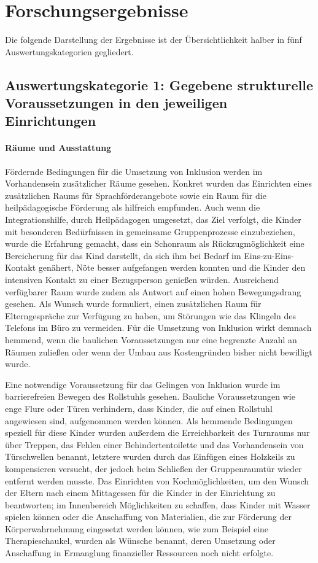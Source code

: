 \section{Forschungsergebnisse}
Die folgende Darstellung der Ergebnisse ist der Übersichtlichkeit halber in fünf Auswertungskategorien gegliedert.
 
\subsection{Auswertungskategorie 1: Gegebene strukturelle Voraussetzungen in den jeweiligen Einrichtungen}

\paragraph{Räume und Ausstattung}
Fördernde Bedingungen für die Umsetzung von Inklusion werden im Vorhandensein zusätzlicher Räume gesehen. Konkret wurden das Einrichten eines zusätzlichen Raums für Sprachförderangebote sowie ein Raum für die heilpädagogische Förderung als hilfreich empfunden. Auch wenn die Integrationshilfe, durch Heilpädagogen umgesetzt, das Ziel verfolgt, die Kinder mit besonderen Bedürfnissen in gemeinsame Gruppenprozesse einzubeziehen, wurde die Erfahrung gemacht, dass ein Schonraum als Rückzugmöglichkeit eine Bereicherung für das Kind darstellt, da sich ihm bei Bedarf im Eins-zu-Eins-Kontakt genähert, Nöte besser aufgefangen werden konnten und die Kinder den intensiven Kontakt zu einer Bezugsperson genießen würden. Ausreichend verfügbarer Raum wurde zudem als Antwort auf einen hohen Bewegungsdrang gesehen. Als Wunsch wurde formuliert, einen zusätzlichen Raum für Elterngespräche zur Verfügung zu haben, um Störungen wie das Klingeln des Telefons im Büro zu vermeiden. 
Für die Umsetzung von Inklusion wirkt demnach hemmend, wenn die baulichen Voraussetzungen nur eine begrenzte Anzahl an Räumen zuließen oder wenn der Umbau aus Kostengründen bisher nicht bewilligt wurde. 

Eine notwendige Voraussetzung für das Gelingen von Inklusion wurde im  barrierefreien Bewegen des Rollstuhls gesehen. Bauliche Voraussetzungen wie enge Flure oder Türen verhindern, dass Kinder, die auf einen Rollstuhl angewiesen sind, aufgenommen werden können. Als hemmende Bedingungen speziell für diese Kinder wurden außerdem die Erreichbarkeit des Turnraums nur über Treppen, das Fehlen einer Behindertentoilette und das Vorhandensein von Türschwellen benannt, letztere wurden durch das Einfügen eines Holzkeils zu kompensieren versucht, der jedoch beim Schließen der Gruppenraumtür wieder entfernt werden musste. 
Das Einrichten von Kochmöglichkeiten, um den Wunsch der Eltern nach einem Mittagessen für die Kinder in der Einrichtung zu beantworten; im Innenbereich Möglichkeiten zu schaffen, dass Kinder mit Wasser spielen können oder die Anschaffung von Materialien, die zur Förderung der Körperwahrnehmung eingesetzt werden können, wie zum Beispiel eine Therapieschaukel, wurden als Wünsche benannt, deren Umsetzung oder Anschaffung in Ermanglung finanzieller Ressourcen noch nicht erfolgte. 

